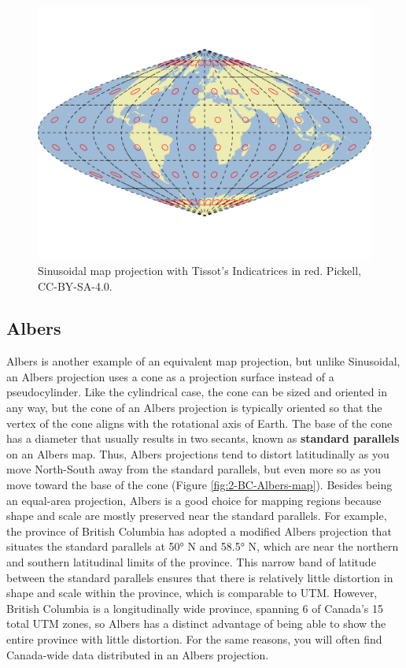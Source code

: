 \documentclass[
]{book}
\begin{document}
\begin{figure}
\includegraphics[width=0.75\linewidth]{images/02-Sinusoidal-map} \caption{Sinusoidal map projection with Tissot's Indicatrices in red. Pickell, CC-BY-SA-4.0.}\label{fig:2-Sinusoidal-map}
\end{figure}

\subsection{Albers}\label{albers}

Albers is another example of an equivalent map projection, but unlike Sinusoidal, an Albers projection uses a cone as a projection surface instead of a pseudocylinder. Like the cylindrical case, the cone can be sized and oriented in any way, but the cone of an Albers projection is typically oriented so that the vertex of the cone aligns with the rotational axis of Earth. The base of the cone has a diameter that usually results in two secants, known as \textbf{standard parallels} on an Albers map. Thus, Albers projections tend to distort latitudinally as you move North-South away from the standard parallels, but even more so as you move toward the base of the cone (Figure \ref{fig:2-BC-Albers-map}). Besides being an equal-area projection, Albers is a good choice for mapping regions because shape and scale are mostly preserved near the standard parallels. For example, the province of British Columbia has adopted a modified Albers projection that situates the standard parallels at 50° N and 58.5° N, which are near the northern and southern latitudinal limits of the province. This narrow band of latitude between the standard parallels ensures that there is relatively little distortion in shape and scale within the province, which is comparable to UTM. However, British Columbia is a longitudinally wide province, spanning 6 of Canada's 15 total UTM zones, so Albers has a distinct advantage of being able to show the entire province with little distortion. For the same reasons, you will often find Canada-wide data distributed in an Albers projection.
\end{document}
